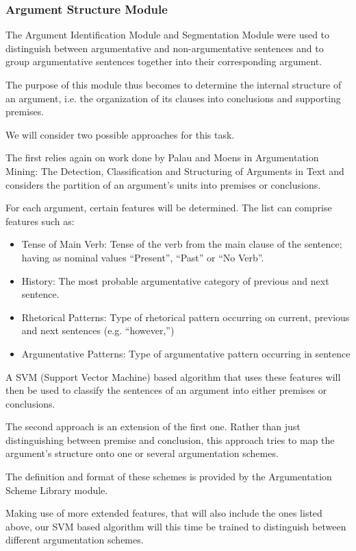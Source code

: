 \subsubsection{Argument Structure Module}
\par
The Argument Identification Module and Segmentation Module were used to distinguish between argumentative and non-argumentative sentences and to group argumentative sentences together into their corresponding argument.
\par
The purpose of this module thus becomes to determine the internal structure of an argument, i.e. the organization of its clauses into conclusions and supporting premises. 
\par
We will consider two possible approaches for this task.
\par
The first relies again on work done by Palau and Moens\cite{Palau} in Argumentation Mining: The Detection, Classification and Structuring of Arguments in Text and considers the partition of an argument’s units into premises or conclusions.
\par
For each argument, certain features will be determined. The list can comprise features such as:
\begin{itemize}
\item Tense of Main Verb: Tense of the verb from the main clause of the sentence; having as nominal values ``Present'', ``Past'' or ``No Verb''.
\item History: The most probable argumentative category of previous and next sentence.
\item Rhetorical Patterns: Type of rhetorical pattern occurring on current, previous and next sentences (e.g. ``however,'')
\item Argumentative Patterns: Type of argumentative pattern occurring in sentence
\end{itemize}
A SVM (Support Vector Machine) based algorithm that uses these features will then be used to classify the sentences of an argument into either premises or conclusions.
\par
The second approach is an extension of the first one. Rather than just distinguishing between premise and conclusion, this approach tries to map the argument’s structure onto one or several argumentation schemes. 
\par
The definition and format of these schemes is provided by the Argumentation Scheme Library module. 
\par
Making use of more extended features, that will also include the ones listed above, our SVM based algorithm will this time be trained to distinguish between different argumentation schemes. 